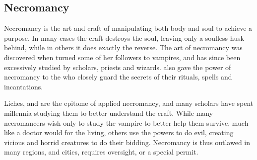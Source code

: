 \subsection{Necromancy}
\label{sec:Necromancy}

Necromancy is the art and craft of manipulating both body and soul to achieve
a purpose. In many cases the craft destroys the soul, leaving only a soulless
husk behind, while in others it does exactly the reverse. The art of
necromancy was discovered when  turned some of her
followers to vampires, and has since been excessively studied by scholars,
priests and wizards.  also gave the power of necromancy to
the  who closely guard the secrets of their rituals, spells
and incantations.

Liches, and  are the epitome of applied necromancy, and
many scholars have spent millennia studying them to better understand the
craft. While many necromancers wish only to study the vampire to better help
them survive, much like a doctor would for the living, others use the powers to
do evil, creating vicious and horrid creatures to do their bidding. Necromancy
is thus outlawed in many regions, and cities, requires oversight, or a special
permit.